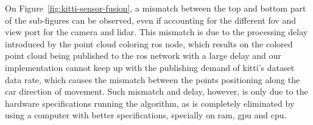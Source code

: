 On Figure~\ref{fig:kitti-sensor-fusion}, a mismatch between the top and bottom part of the sub-figures can be observed, even if accounting for the different \ac{fov} and view port for the camera and \ac{lidar}. This mismatch is due to the processing delay introduced by the point cloud coloring \ac{ros} node, which results on the colored point cloud being published to the \ac{ros} network with a large delay and our implementation cannot keep up with the publishing demand of \ac{kitti}'s dataset data rate, which causes the mismatch between the points positioning along the car direction of movement. Such mismatch and delay, however, is only due to the hardware  specifications running the algorithm, as is completely eliminated by using a computer with better specifications, specially on \ac{ram}, \ac{gpu} and \ac{cpu}.

